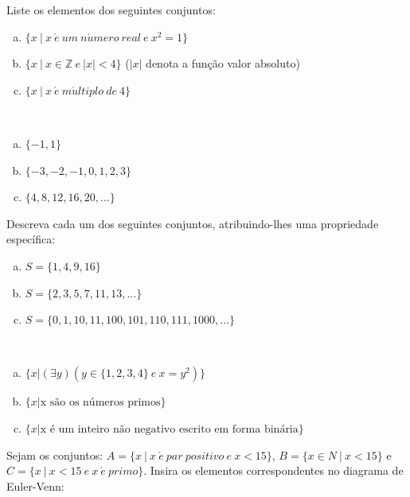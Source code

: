 \documentclass[a4paper, 12pt, addpoints]{exam}
\begin{document}
\begin{questions}
\question Liste os elementos dos seguintes conjuntos:
\begin{enumerate}[a)]
    \item $\{ x ~ | ~ x ~ \acute{e} ~ um ~ n\acute{u}mero ~ real ~ e ~ x^2 = 1 \}$
    \item $\{ x ~ | ~ x \in \mathbb{Z} ~ e ~ |x| < 4 \}$ ($|x|$ denota a função valor absoluto)
    \item $\{x ~ | ~ x ~ \acute{e} ~ m\acute{u}ltiplo ~ de ~ 4 \}$
\end{enumerate}

\begin{resp}~
    \begin{enumerate}[a)]
        \item $\{ -1, 1 \}$
        \item $\{ -3, -2, -1, 0, 1, 2, 3 \}$ 
        \item $\{{4,8,12,16,20,...} \}$
    \end{enumerate}
    
\end{resp}

\question Descreva cada um dos seguintes conjuntos, atribuindo-lhes uma propriedade específica:
\begin{enumerate}[a)]
    \item $S = \{1, 4, 9, 16\}$
    \item $S = \{2, 3, 5, 7, 11, 13, . . . \}$
    \item $S = \{0, 1, 10, 11, 100, 101, 110, 111, 1000, \dots \}$
\end{enumerate}

\begin{resp}~

    \begin{enumerate}[a)]
        \item $\{ x | (\exists y)( y \in \{1,2,3,4\} ~ e ~ x = y^2) \}$
        \item $\{ x | \text{x são os números primos}\}$ 
        \item $\{{x| \text{x é um inteiro não negativo escrito em forma binária}}\}$
    \end{enumerate}
    
\end{resp}

\question Sejam os conjuntos: $A = \{x ~ | ~ x ~ \acute{e} ~ par ~ positivo ~ e ~ x < 15\}$, $B = \{x \in N ~ | ~ x < 15\}$ e $C = \{x ~ | ~ x < 15 ~ e ~ x ~ \acute{e} ~ primo \}$. Insira os elementos correspondentes no diagrama de Euler-Venn:


\end{questions}
\end{document}
